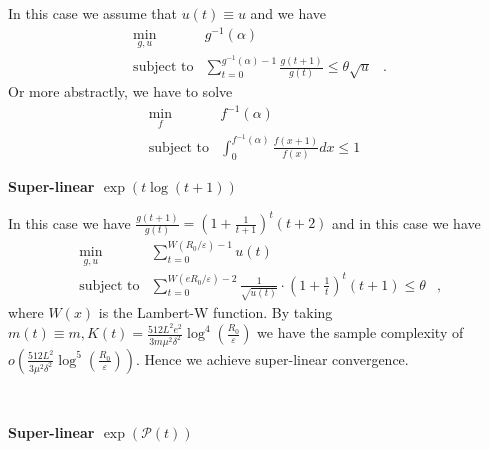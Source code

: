\documentclass{article}
\newcommand{\cdummy}{\cdot}
\newcommand{\tmstrong}[1]{\textbf{#1}}
\begin{document}
In this case we assume that $u (t) \equiv u$ and we have
\begin{eqnarray*}
  \min_{g, u} & g^{- 1} (\alpha) & \\
  \text{subject to} & \sum_{t = 0}^{g^{- 1} (\alpha) - 1} \frac{g (t + 1)}{g
  (t)} \leq \theta \sqrt{u} & .
\end{eqnarray*}
Or more abstractly, we have to solve
\begin{eqnarray*}
  \min_f & f^{- 1} (\alpha) & \\
  \text{subject to} & \int_0^{f^{- 1} (\alpha)} \frac{f (x + 1)}{f (x)} d x
  \leq 1 & 
\end{eqnarray*}


{\tmstrong{Super-linear $\exp (t \log (t + 1))$}}

In this case we have $\frac{g (t + 1)}{g (t)} = \left( 1 + \frac{1}{t + 1}
\right)^t (t + 2)$ and in this case we have
\begin{eqnarray*}
  \min_{g, u} & \sum_{t = 0}^{W (R_0 / \varepsilon) - 1} u (t) & \\
  \text{subject to} & \sum_{t = 0}^{W (e R_0 / \varepsilon) - 2}
  \frac{1}{\sqrt{u (t)}} \cdummy \left( 1 + \frac{1}{t} \right)^t (t + 1) \leq
  \theta & ,
\end{eqnarray*}
where $W (x)$ is the Lambert-W function. By taking $m (t) \equiv m, K (t) =
\frac{512 L^2 e^2}{3 m \mu^2 \delta^2} \log^4 \left( \frac{R_0}{\varepsilon}
\right)$ we have the sample complexity of $o \left( \frac{512 L^2}{3 \mu^2
\delta^2} \log^5 \left( \frac{R_0}{\varepsilon} \right) \right)$. Hence we
achieve super-linear convergence.

\

{\tmstrong{Super-linear $\exp (\mathcal{P} (t))$}}
\end{document}
